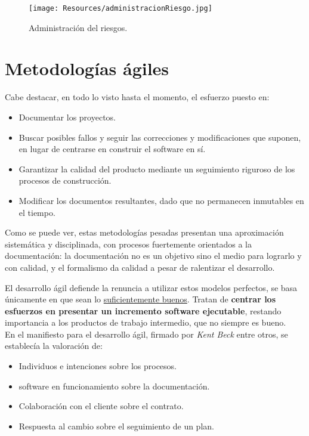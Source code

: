 \begin{figure}[H]
   \centering
   \texttt{[image: Resources/administracionRiesgo.jpg]}
   \caption{Administración del riesgos.}
   \label{fig:administracionRiesgo}
\end{figure}





\section{Metodologías ágiles}

Cabe destacar, en todo lo visto hasta el momento, el esfuerzo puesto en:

\begin{itemize}
   \item Documentar los proyectos.
   \item Buscar posibles fallos y seguir las correcciones y modificaciones que suponen, en lugar de centrarse en construir el software en sí.
   \item Garantizar la calidad del producto mediante un seguimiento riguroso de los procesos de construcción.
   \item Modificar los documentos resultantes, dado que no permanecen inmutables en el tiempo.
\end{itemize}

Como se puede ver, estas metodologías pesadas presentan una aproximación sistemática y disciplinada, con procesos fuertemente orientados a la documentación: la documentación no es un objetivo sino el medio para lograrlo y con calidad, y el formalismo da calidad a pesar de ralentizar el desarrollo.

El desarrollo ágil defiende la renuncia a utilizar estos modelos perfectos, se basa únicamente en que sean lo \uline{suficientemente buenos}. Tratan de \textbf{centrar los esfuerzos en presentar un incremento software ejecutable}, restando importancia a los productos de trabajo intermedio, que no siempre es bueno.\\

En el manifiesto para el desarrollo ágil, firmado por \textit{Kent Beck} entre otros, se establecía la valoración de:

\begin{itemize}
   \item Individuos e intenciones sobre los procesos.
   \item software en funcionamiento sobre la documentación.
   \item Colaboración con el cliente sobre el contrato.
   \item Respuesta al cambio sobre el seguimiento de un plan.
\end{itemize}

